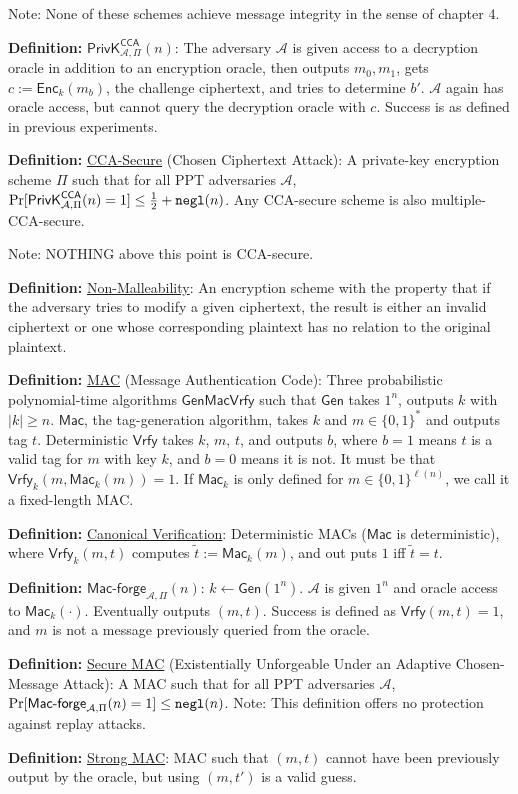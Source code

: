\documentclass[10pt]{article}
\newcommand{\AAA}{\mathcal{A}}
\newcommand{\defn}[1]{{\bf Definition:} \underline{#1}}
\newcommand{\Enc}{\mathsf{Enc}}
\newcommand{\Mac}{\mathsf{Mac}}
\newcommand{\Macf}{\mathsf{Mac\text{-}forge}}
\newcommand{\Vrfy}{\mathsf{Vrfy}}
\newcommand{\Gen}{\mathsf{Gen}}
\newcommand{\ExptCcaArgs}[2]{\mathsf{PrivK}^{\mathsf{CCA}}_{#1,#2}}
\newcommand{\ExptCca}{\ExptCcaArgs{\AAA}{\Pi}}
\newcommand{\negl}{{\tt negl}}
\newcommand{\from}{\leftarrow}
\begin{document}
\begin{multicols}{5}
Note: None of these schemes achieve message integrity in the sense of chapter 4.

\defn{$\ExptCca(n)$}: The adversary $\AAA$ is given access to a decryption oracle in addition to an encryption oracle, then outputs $m_0,m_1$, gets $c:=\Enc_k(m_b)$, the challenge ciphertext, and tries to determine $b'$. $\AAA$ again has oracle access, but cannot query the decryption oracle with $c$. Success is as defined in previous experiments.

\defn{CCA-Secure} (Chosen Ciphertext Attack): A private-key encryption scheme $\Pi$ such that for all PPT adversaries $\AAA$, $\Pr[\ExptCca(n)=1]\leq\frac{1}{2}+\negl(n)$. Any CCA-secure scheme is also multiple-CCA-secure.

Note: NOTHING above this point is CCA-secure.

\defn{Non-Malleability}: An encryption scheme with the property that if the adversary tries to modify a given ciphertext, the result is either an invalid ciphertext or one whose corresponding plaintext has no relation to the original plaintext.

\defn{MAC} (Message Authentication Code): Three probabilistic polynomial-time algorithms $\Gen\Mac\Vrfy$ such that $\Gen$ takes $1^n$, outputs $k$ with $|k|\geq n$. $\Mac$, the tag-generation algorithm, takes $k$ and $m\in\{0,1\}^*$ and outputs tag $t$. Deterministic $\Vrfy$ takes $k$, $m$, $t$, and outputs $b$, where $b=1$ means $t$ is a valid tag for $m$ with key $k$, and $b=0$ means it is not. It must be that $\Vrfy_k(m,\Mac_k(m))=1$. If $\Mac_k$ is only defined for $m\in\{0,1\}^{\ell(n)}$, we call it a fixed-length MAC.

\defn{Canonical Verification}: Deterministic MACs ($\Mac$ is deterministic), where $\Vrfy_k(m,t)$ computes $\tilde{t}:=\Mac_k(m)$, and out puts $1$ iff $\tilde{t}=t$.

\defn{$\Macf_{\AAA,\Pi}(n)$}: $k\from\Gen(1^n)$. $\AAA$ is given $1^n$ and oracle access to $\Mac_k(\cdot)$. Eventually outputs $(m,t)$. Success is defined as $\Vrfy(m,t)=1$, and $m$ is not a message previously queried from the oracle.

\defn{Secure MAC} (Existentially Unforgeable Under an Adaptive Chosen-Message Attack): A MAC such that for all PPT adversaries $\AAA$, $\Pr[\Macf_{\AAA,\Pi}(n)=1]\leq\negl(n)$. Note: This definition offers no protection against replay attacks.

\defn{Strong MAC}: MAC such that $(m,t)$ cannot have been previously output by the oracle, but using $(m,t')$ is a valid guess.


\end{multicols}
\end{document}
